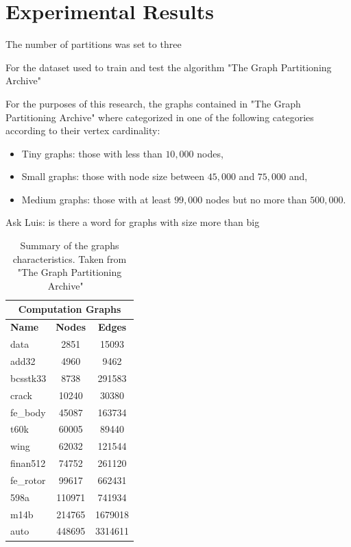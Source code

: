 %
%
\let\textcircled=\pgftextcircled
\chapter{Experimental Results}
\label{Chapter4}
The number of partitions was set to three 

For the dataset used to train and test the algorithm "The Graph Partitioning Archive"~\cite{archive}

For the purposes of this research, the graphs contained in "The Graph Partitioning Archive" where categorized in one of the following categories according to their vertex cardinality: 
\begin{itemize}
    \item Tiny graphs: those with less than $10,000$ nodes,
    \item Small graphs: those with node size between $45,000$ and $75,000$ and,
    \item Medium graphs: those with at least $99,000$ nodes but no more than $500,000$.
\end{itemize}

Ask Luis: is there a word for graphs with size more than big

\begin{table}
\centering
\begin{tabular}{ |p{1.75cm}||cc|  }
\hline
\multicolumn{3}{|c|}{\textbf{Computation Graphs}} \\
\hline
\hline
\textbf{Name} & \textbf{Nodes} & \textbf{Edges} \\
\hline
data & 2851 & 15093  \\
add32 & 4960 & 9462  \\
bcsstk33 & 8738 & 291583  \\
crack & 10240 & 30380  \\
\hline
fe\_body & 45087 & 163734  \\
t60k & 60005 & 89440  \\
wing & 62032 & 121544  \\
finan512 & 74752 & 261120 \\
\hline
fe\_rotor & 99617 & 662431  \\
598a & 110971 & 741934  \\
m14b & 214765 & 1679018	 \\
auto & 448695 & 3314611  \\
\hline
\end{tabular}
\caption{\label{tab:results}Summary of the graphs characteristics. Taken from "The Graph Partitioning Archive" ~\cite{archive}}
\end{table}

